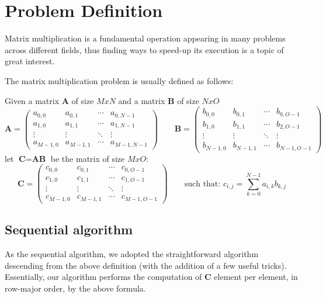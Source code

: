 \section{Problem Definition}

Matrix multiplication is a fundamental operation appearing in many problems across different fields, thus finding ways to speed-up its execution is a topic of great interest.

The matrix multiplication problem is usually defined as follows:

Given a matrix $\textbf{A}$ of size $MxN$ and a matrix $\textbf{B}$ of size $NxO$
\[ \textbf{A} = \begin{pmatrix}
    a_{0, 0} & a_{0, 1} & \cdots & a_{0, N-1} \\
    a_{1, 0} & a_{1, 1} & \cdots & a_{1, N-1} \\
    \vdots  & \vdots  & \ddots & \vdots  \\
    a_{M-1, 0} & a_{M-1, 1} & \cdots & a_{M-1, N-1} 
\end{pmatrix} \quad\quad \textbf{B} =
\begin{pmatrix}
    b_{0, 0} & b_{0, 1} & \cdots & b_{0, O-1} \\
    b_{1, 0} & b_{1, 1} & \cdots & b_{2, O-1} \\
    \vdots  & \vdots  & \ddots & \vdots  \\
    b_{N-1, 0} & b_{N-1, 1} & \cdots & b_{N-1, O-1} 
\end{pmatrix} \]
let $\textbf{C} = \textbf{AB}$ be the matrix of size $MxO$:
\[ \textbf{C} = \begin{pmatrix}
    c_{0, 0} & c_{0, 1} & \cdots & c_{0, O-1} \\
    c_{1, 0} & c_{1, 1} & \cdots & c_{1, O-1} \\
    \vdots  & \vdots  & \ddots & \vdots  \\
    c_{M-1, 0} & c_{M-1, 1} & \cdots & c_{M-1, O-1} 
\end{pmatrix} \quad\quad \text{such that:  }
c_{i, j} = \sum_{k=0}^{N - 1} a_{i, k}b_{k, j} \]

\subsection{Sequential algorithm}
As the sequential algorithm, we adopted the straightforward algorithm descending from the above definition (with the addition of a few useful tricks).
Essentially, our algorithm performs the computation of $\textbf{C}$ element per element, in row-major order, by the above formula.

